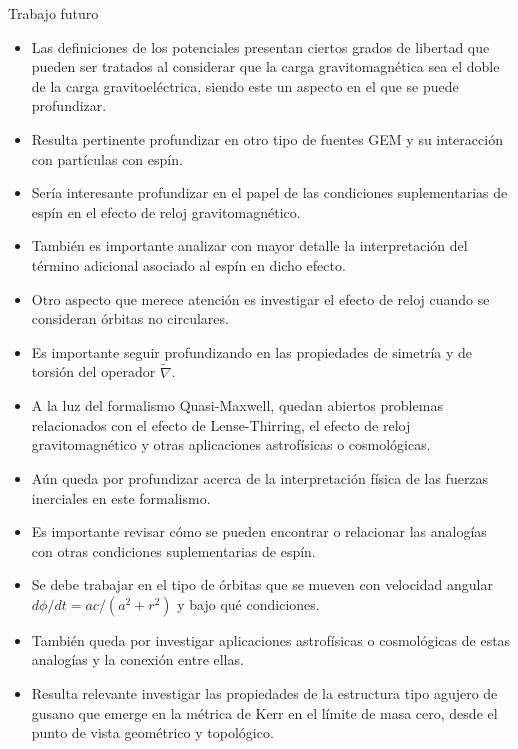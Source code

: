 \documentclass[aspectratio=169,10pt,usenames,dvipsnames,spanish]{beamer}
\begin{document}
\begin{frame}{Trabajo futuro}

\begin{itemize}

\item Las definiciones de los potenciales presentan ciertos grados de libertad que pueden ser tratados al considerar que la carga gravitomagnética sea el doble de la carga gravitoeléctrica, siendo este un aspecto en el que se puede profundizar.

\item Resulta pertinente profundizar en otro tipo de fuentes GEM y su interacción con partículas con espín.

\item Sería interesante profundizar en el papel de las condiciones suplementarias de espín en el efecto de reloj gravitomagnético.

\item También es importante analizar con mayor detalle la interpretación del término adicional asociado al espín en dicho efecto.

\item Otro aspecto que merece atención es investigar el efecto de reloj cuando se consideran órbitas no circulares.

\item Es importante seguir profundizando en las propiedades de simetría y de torsión del operador $\tilde{\nabla}$.

\item A la luz del formalismo Quasi-Maxwell, quedan abiertos problemas relacionados con el efecto de Lense-Thirring, el efecto de reloj gravitomagnético y otras aplicaciones astrofísicas o cosmológicas.

\item Aún queda por profundizar acerca de la interpretación física de las fuerzas inerciales en este formalismo.

\item Es importante revisar cómo se pueden encontrar o relacionar las analogías con otras condiciones suplementarias de espín.

\item Se debe trabajar en el tipo de órbitas que se mueven con velocidad angular $d\phi/dt=ac/(a^2+r^2)$ y bajo qué condiciones.

\item También queda por investigar aplicaciones astrofísicas o cosmológicas de estas analogías y la conexión entre ellas.

\item Resulta relevante investigar las propiedades de la estructura tipo agujero de gusano que emerge en la métrica de Kerr en el límite de masa cero, desde el punto de vista geométrico y topológico.

\end{itemize}

\end{frame}
\end{document}
